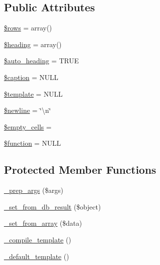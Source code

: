 \subsection*{Public Attributes}
\begin{DoxyCompactItemize}
\item 
\mbox{\hyperlink{class_c_i___table_ace2ec39e7df3899fa8df9640ec274b03}{\$rows}} = array()
\item 
\mbox{\hyperlink{class_c_i___table_a196169be7715d466e3310388b096598c}{\$heading}} = array()
\item 
\mbox{\hyperlink{class_c_i___table_a394ea4ec17bcd63228039d7767bfb092}{\$auto\+\_\+heading}} = T\+R\+UE
\item 
\mbox{\hyperlink{class_c_i___table_a4f9340ccb02c5d876a448a1d860f3812}{\$caption}} = N\+U\+LL
\item 
\mbox{\hyperlink{class_c_i___table_aa3e9534005fd516d941f6a5569896e01}{\$template}} = N\+U\+LL
\item 
\mbox{\hyperlink{class_c_i___table_a8735d5c31c4af1004825e6a28f236aeb}{\$newline}} = \char`\"{}\textbackslash{}n\char`\"{}
\item 
\mbox{\hyperlink{class_c_i___table_aeba996c863f9ba0e2c9e24d0491bb976}{\$empty\+\_\+cells}} = \textquotesingle{}\textquotesingle{}
\item 
\mbox{\hyperlink{class_c_i___table_af3e5d0d1ff43879d493dd97bb760c479}{\$function}} = N\+U\+LL
\end{DoxyCompactItemize}
\subsection*{Protected Member Functions}
\begin{DoxyCompactItemize}
\item 
\mbox{\hyperlink{class_c_i___table_aec91c20b757a8a063e4147f0aebe8b1b}{\+\_\+prep\+\_\+args}} (\$args)
\item 
\mbox{\hyperlink{class_c_i___table_a76d76f4f5ffe03c119b95164dcebf9ed}{\+\_\+set\+\_\+from\+\_\+db\+\_\+result}} (\$object)
\item 
\mbox{\hyperlink{class_c_i___table_a79c6ca8fd1f4e5b4bee157209e866a02}{\+\_\+set\+\_\+from\+\_\+array}} (\$data)
\item 
\mbox{\hyperlink{class_c_i___table_a7f408fd4eecadb5799d5ae004170c4d6}{\+\_\+compile\+\_\+template}} ()
\item 
\mbox{\hyperlink{class_c_i___table_ae1990fcb9ffc455614eeac9a1091f0b0}{\+\_\+default\+\_\+template}} ()
\end{DoxyCompactItemize}


